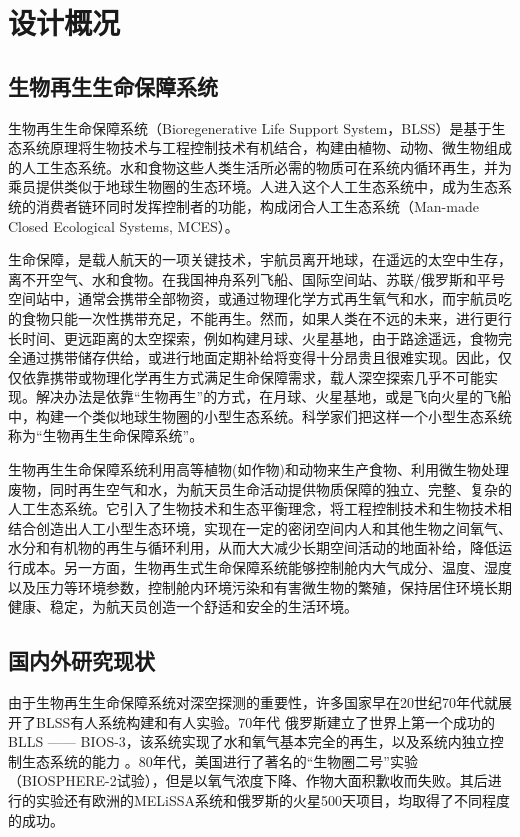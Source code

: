 \def\BLLS{生物再生生命保障系统}
\chapter{设计概况}
\label{chp:intro:begin}

\section{生物再生生命保障系统}

生物再生生命保障系统（Bioregenerative Life Support System，BLSS）是基于生态系统原理将生物技术与工程控制技术有机结合，构建由植物、动物、微生物组成的人工生态系统。水和食物这些人类生活所必需的物质可在系统内循环再生，并为乘员提供类似于地球生物圈的生态环境。人进入这个人工生态系统中，成为生态系统的消费者链环同时发挥控制者的功能，构成闭合人工生态系统（Man-made Closed Ecological Systems, MCES）。

生命保障，是载人航天的一项关键技术，宇航员离开地球，在遥远的太空中生存，离不开空气、水和食物。在我国神舟系列飞船、国际空间站、苏联/俄罗斯和平号空间站中，通常会携带全部物资，或通过物理化学方式再生氧气和水，而宇航员吃的食物只能一次性携带充足，不能再生。然而，如果人类在不远的未来，进行更行长时间、更远距离的太空探索，例如构建月球、火星基地，由于路途遥远，食物完全通过携带储存供给，或进行地面定期补给将变得十分昂贵且很难实现。因此，仅仅依靠携带或物理化学再生方式满足生命保障需求，载人深空探索几乎不可能实现。解决办法是依靠“生物再生”的方式，在月球、火星基地，或是飞向火星的飞船中，构建一个类似地球生物圈的小型生态系统。科学家们把这样一个小型生态系统称为“生物再生生命保障系统”。

生物再生生命保障系统利用高等植物(如作物)和动物来生产食物、利用微生物处理废物，同时再生空气和水，为航天员生命活动提供物质保障的独立、完整、复杂的人工生态系统。它引入了生物技术和生态平衡理念，将工程控制技术和生物技术相结合创造出人工小型生态环境，实现在一定的密闭空间内人和其他生物之间氧气、水分和有机物的再生与循环利用，从而大大减少长期空间活动的地面补给，降低运行成本。另一方面，生物再生式生命保障系统能够控制舱内大气成分、温度、湿度以及压力等环境参数，控制舱内环境污染和有害微生物的繁殖，保持居住环境长期健康、稳定，为航天员创造一个舒适和安全的生活环境。

\section{国内外研究现状}
由于\BLLS 对深空探测的重要性，许多国家早在20世纪70年代就展开了BLSS有人系统构建和有人实验。70年代 俄罗斯建立了世界上第一个成功的BLLS —— BIOS-3，该系统实现了水和氧气基本完全的再生，以及系统内独立控制生态系统的能力 。80年代，美国进行了著名的“生物圈二号”实验（BIOSPHERE-2试验），但是以氧气浓度下降、作物大面积歉收而失败。其后进行的实验还有欧洲的MELiSSA系统和俄罗斯的火星500天项目，均取得了不同程度的成功。

